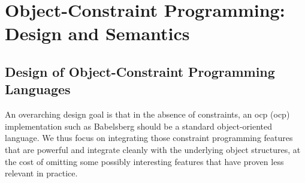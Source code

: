 





\part{Object-Constraint Programming: Design and Semantics}
\label{part:object-constr-progr}

\chapter{Design of Object-Constraint Programming Languages}
\label{sec:design}

An overarching design goal is that in the absence of constraints, an
\acrlong{ocp} (\acrshort{ocp}) implementation such as Babelsberg should be a
standard object-oriented language. We thus focus on integrating those constraint
programming features that are powerful and integrate cleanly with the underlying
object structures, at the cost of omitting some possibly interesting features
that have proven less relevant in practice.

